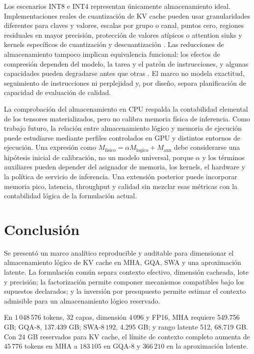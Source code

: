 \documentclass[a4paper,twocolumn]{article}
\begin{document}
Los escenarios INT8 e INT4 representan únicamente almacenamiento ideal. Implementaciones reales de cuantización de KV cache pueden usar granularidades diferentes para claves y valores, escalas por grupo o canal, puntos cero, regiones residuales en mayor precisión, protección de valores atípicos o attention sinks y kernels específicos de cuantización y descuantización \cite{liu2024kivi,duanmu2024skvq}. Las reducciones de almacenamiento tampoco implican equivalencia funcional: los efectos de compresión dependen del modelo, la tarea y el patrón de instrucciones, y algunas capacidades pueden degradarse antes que otras \cite{chen2026pitfalls}. El marco no modela exactitud, seguimiento de instrucciones ni perplejidad y, por diseño, separa planificación de capacidad de evaluación de calidad.

La comprobación del almacenamiento en CPU respalda la contabilidad elemental de los tensores materializados, pero no calibra memoria física de inferencia. Como trabajo futuro, la relación entre almacenamiento lógico y memoria de ejecución puede estudiarse mediante perfiles controlados en GPU y distintos entornos de ejecución. Una expresión como $M_{\mathrm{fisico}}=\alpha M_{\mathrm{logico}}+M_{\mathrm{aux}}$ debe considerarse una hipótesis inicial de calibración, no un modelo universal, porque $\alpha$ y los términos auxiliares pueden depender del asignador de memoria, los kernels, el hardware y la política de servicio de inferencia. Una extensión posterior puede incorporar memoria pico, latencia, throughput y calidad sin mezclar esas métricas con la contabilidad lógica de la formulación actual.

\section{Conclusión}
Se presentó un marco analítico reproducible y auditable para dimensionar el almacenamiento lógico de KV cache en MHA, GQA, SWA y una aproximación latente. La formulación común separa contexto efectivo, dimensión cacheada, lote y precisión; la factorización permite componer mecanismos compatibles bajo los supuestos declarados; y la inversión por presupuesto permite estimar el contexto admisible para un almacenamiento lógico reservado.

En $1\,048\,576$ tokens, 32 capas, dimensión $4\,096$ y FP16, MHA requiere 549.756 GB; GQA-8, 137.439 GB; SWA-$8\,192$, 4.295 GB; y rango latente 512, 68.719 GB. Con 24 GB reservados para KV cache, el límite de contexto completo aumenta de $45\,776$ tokens en MHA a $183\,105$ en GQA-8 y $366\,210$ en la aproximación latente.
\end{document}
